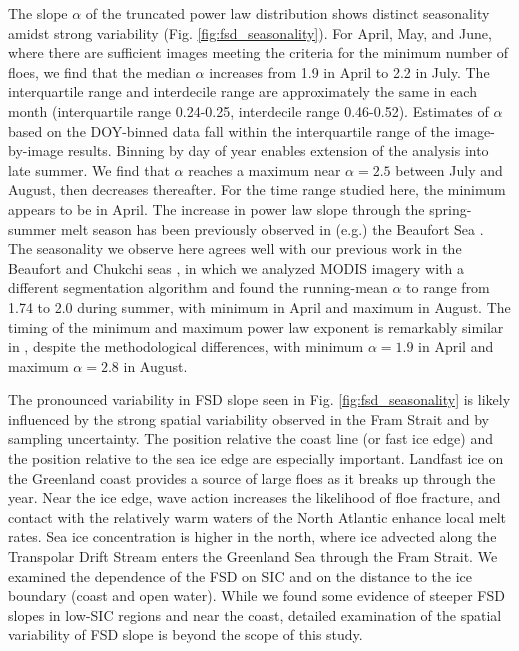 \documentclass[aog]{igs}
\begin{document}
The slope $\alpha$ of the truncated power law distribution shows distinct seasonality amidst strong variability (Fig. \ref{fig:fsd_seasonality}).
For April, May, and June, where there are sufficient images meeting the criteria for the minimum number of floes, we find that the median $\alpha$ increases from 1.9 in April to 2.2 in July. The interquartile range and interdecile range are approximately the same in each month (interquartile range 0.24-0.25, interdecile range 0.46-0.52).  
Estimates of $\alpha$ based on the DOY-binned data fall within the interquartile range of the image-by-image results.
Binning by day of year enables extension of the analysis into late summer.
We find that $\alpha$ reaches a maximum near $\alpha=2.5$ between July and August, then decreases thereafter. For the time range studied here, the minimum appears to be in April.
The increase in power law slope through the spring-summer melt season has been previously observed in (e.g.) the Beaufort Sea \citep{hwang2017_WintertosummerTransition, stern2018_SeasonalEvolution}.
The seasonality we observe here agrees well with our previous work in the Beaufort and Chukchi seas \citep{buckley2024_SeasonalEvolution}, in which we analyzed MODIS imagery with a different segmentation algorithm and found the running-mean $\alpha$ to range from 1.74 to 2.0 during summer, with minimum in April and maximum in August. The timing of the minimum and maximum power law exponent is remarkably similar in \cite{stern2018_SeasonalEvolution}, despite the methodological differences, with minimum $\alpha=1.9$ in April and maximum $\alpha=2.8$ in August.

The pronounced variability in FSD slope seen in Fig. \ref{fig:fsd_seasonality} is likely influenced by the strong spatial variability observed in the Fram Strait and by sampling uncertainty.
The position relative the coast line (or fast ice edge) and the position relative to the sea ice edge are especially important. Landfast ice on the Greenland coast provides a source of large floes as it breaks up through the year. 
Near the ice edge, wave action increases the likelihood of floe fracture, and contact with the relatively warm waters of the North Atlantic enhance local melt rates.
Sea ice concentration is higher in the north, where ice advected along the Transpolar Drift Stream enters the Greenland Sea through the Fram Strait.
We examined the dependence of the FSD on SIC and on the distance to the ice boundary (coast and open water). While we found some evidence of steeper FSD slopes in low-SIC regions and near the coast, detailed examination of the spatial variability of FSD slope is beyond the scope of this study.
\end{document}
